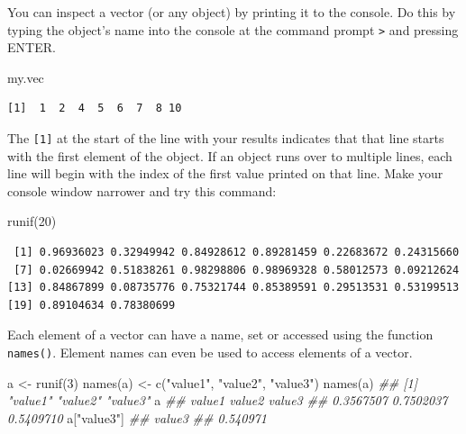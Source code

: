 \documentclass[
  13,
  letterpaper,
]{report}
\newenvironment{Shaded}{\begin{snugshade}}{\end{snugshade}}
\newcommand{\DecValTok}[1]{\textcolor[rgb]{0.68,0.00,0.00}{#1}}
\newcommand{\DocumentationTok}[1]{\textcolor[rgb]{0.37,0.37,0.37}{\textit{#1}}}
\newcommand{\FunctionTok}[1]{\textcolor[rgb]{0.28,0.35,0.67}{#1}}
\newcommand{\NormalTok}[1]{\textcolor[rgb]{0.00,0.23,0.31}{#1}}
\newcommand{\OtherTok}[1]{\textcolor[rgb]{0.00,0.23,0.31}{#1}}
\newcommand{\StringTok}[1]{\textcolor[rgb]{0.13,0.47,0.30}{#1}}
\begin{document}
You can inspect a vector (or any object) by printing it to the console.
Do this by typing the object's name into the console at the command
prompt \texttt{\textgreater{}} and pressing ENTER.

\begin{Shaded}
\begin{Highlighting}[]
\NormalTok{my.vec}
\end{Highlighting}
\end{Shaded}

\begin{verbatim}
[1]  1  2  4  5  6  7  8 10
\end{verbatim}

The \texttt{{[}1{]}} at the start of the line with your results
indicates that that line starts with the first element of the object. If
an object runs over to multiple lines, each line will begin with the
index of the first value printed on that line. Make your console window
narrower and try this command:

\begin{Shaded}
\begin{Highlighting}[]
\FunctionTok{runif}\NormalTok{(}\DecValTok{20}\NormalTok{)}
\end{Highlighting}
\end{Shaded}

\begin{verbatim}
 [1] 0.96936023 0.32949942 0.84928612 0.89281459 0.22683672 0.24315660
 [7] 0.02669942 0.51838261 0.98298806 0.98969328 0.58012573 0.09212624
[13] 0.84867899 0.08735776 0.75321744 0.85389591 0.29513531 0.53199513
[19] 0.89104634 0.78380699
\end{verbatim}

Each element of a vector can have a name, set or accessed using the
function \texttt{names()}. Element names can even be used to access
elements of a vector.

\begin{Shaded}
\begin{Highlighting}[]
\NormalTok{a }\OtherTok{\textless{}{-}} \FunctionTok{runif}\NormalTok{(}\DecValTok{3}\NormalTok{)}
\FunctionTok{names}\NormalTok{(a) }\OtherTok{\textless{}{-}} \FunctionTok{c}\NormalTok{(}\StringTok{"value1"}\NormalTok{, }\StringTok{"value2"}\NormalTok{, }\StringTok{"value3"}\NormalTok{)}
\FunctionTok{names}\NormalTok{(a)}
\DocumentationTok{\#\# [1] "value1" "value2" "value3"}
\NormalTok{a}
\DocumentationTok{\#\#    value1    value2    value3 }
\DocumentationTok{\#\# 0.3567507 0.7502037 0.5409710}
\NormalTok{a[}\StringTok{"value3"}\NormalTok{]}
\DocumentationTok{\#\#   value3 }
\DocumentationTok{\#\# 0.540971}
\end{Highlighting}
\end{Shaded}
\end{document}
